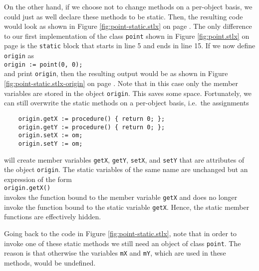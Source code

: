 On the other hand, if we choose not to change methods on a per-object basis, we could just as well
declare these methods to be static.  Then, the resulting code would look as shown in Figure
\ref{fig:point-static.stlx} on page \pageref{fig:point-static.stlx}.  The only difference to our
first implementation of the class \texttt{point} shown in Figure \ref{fig:point.stlx} on page
\pageref{fig:point.stlx} is the \texttt{static} block that starts in line 5 and ends in line 15.
If we now define \texttt{origin} as
\\[0.2cm]
\hspace*{1.3cm}
\texttt{origin := point(0, 0);}
\\[0.2cm]
and print \texttt{origin}, then the resulting output would be as shown in Figure
\ref{fig:point-static.stlx-origin} on page \pageref{fig:point-static.stlx-origin}.
Note that in this case only the member variables are stored in the object
\texttt{origin}.  This saves some space.  
Fortunately, we can still overwrite the static methods on a per-object
basis, i.e.~the assignments
\begin{verbatim}
    origin.getX := procedure() { return 0; };
    origin.getY := procedure() { return 0; };
    origin.setX := om;
    origin.setY := om;
\end{verbatim}
will create member variables \texttt{getX}, \texttt{getY}, \texttt{setX}, and \texttt{setY}
that are attributes of the object \texttt{origin}.  The static variables of the same name are
unchanged but an expression of the form
\\[0.2cm]
\hspace*{1.3cm}
\texttt{origin.getX()}
\\[0.2cm]
invokes the function bound to the member variable \texttt{getX} and does no longer invoke
the function bound to the static variable \texttt{getX}.  Hence, the static member functions are
effectively hidden.

Going back to the code in Figure \ref{fig:point-static.stlx}, note that in order to invoke one of these
static methods we still need an object of class \texttt{point}.  The reason is that otherwise the
variables \texttt{mX} and \texttt{mY}, which are used in these methods, would be undefined.

